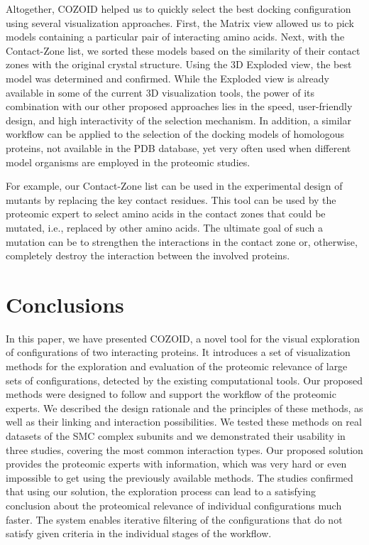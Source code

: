 \documentclass{bmcart}
\def\ExpView {Exploded view\xspace}
\def\MatView {Matrix view\xspace}
\def\CoZoList{Contact-Zone list\xspace}
\begin{document}
Altogether, COZOID helped us to quickly select the best docking configuration using several visualization approaches. 
First, the \MatView allowed us to pick models containing a particular pair of interacting amino acids. 
Next, with the \CoZoList, we sorted these models based on the similarity of their contact zones with the original crystal structure. 
Using the 3D \ExpView, the best model was determined and confirmed. 
While the Exploded view is already available in some of the current 3D visualization tools, the power of its combination with our other proposed approaches lies in the speed, user-friendly design, and high interactivity of the selection mechanism. 
In addition, a similar workflow can be applied to the selection of the docking models of homologous proteins, not available in the PDB database, yet very often used when different model organisms are employed in the proteomic studies.
 
For example, our \CoZoList can be used in the experimental design of mutants by replacing the key contact residues. 
This tool can be used by the proteomic expert to select amino acids in the contact zones that could be mutated, i.e., replaced by other amino acids.
The ultimate goal of such a mutation can be to strengthen the interactions in the contact zone or, otherwise, completely destroy the interaction between the involved proteins. 


\section*{Conclusions}
In this paper, we have presented COZOID, a novel tool for the visual exploration of configurations of two interacting proteins. 
It introduces a set of visualization methods for the exploration and evaluation of the proteomic relevance of large sets of configurations, detected by the existing computational tools.
Our proposed methods were designed to follow and support the workflow of the proteomic experts.
We described the design rationale and the principles of these methods, as well as their linking and interaction possibilities. 
We tested these methods on real datasets of the SMC complex subunits and we demonstrated their usability in three studies, covering the most common interaction types.
Our proposed solution provides the proteomic experts with information, which was very hard or even impossible to get using the previously available methods.
The studies confirmed that using our solution, the exploration process can lead to a satisfying conclusion about the proteomical relevance of individual configurations much faster.
The system enables iterative filtering of the configurations that do not satisfy given criteria in the individual stages of the workflow.
\end{document}
